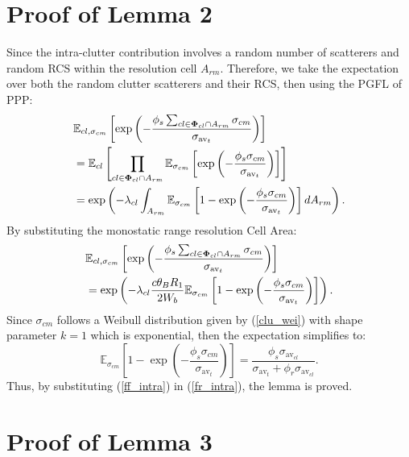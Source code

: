 \documentclass[journal]{IEEEtran}
\begin{document}
\section{Proof of Lemma 2}
Since the intra-clutter contribution involves a random number of scatterers and random  RCS within the resolution cell \( A_{rm} \). Therefore, we take the expectation over both the random clutter scatterers and their RCS, then
using the PGFL of PPP:
\begin{equation}
\begin{aligned}
&\mathbb{E}_{cl, \sigma_{cm}} \left[ \exp\left( - \frac{\phi_s \sum_{cl \in \bold\Phi_{cl} \cap A_{rm}} \sigma_{cm}}{\sigma_{\text{av}_t}} \right) \right]\\
&=\mathbb{E}_{cl}\left[ \prod_{cl \in \bold\Phi_{cl} \cap A_{rm}} \mathbb{E}_{\sigma_{cm}}\left[ \exp\left( - \frac{\phi_s  \sigma_{cm}}{\sigma_{\text{av}_t}} \right)\right] \right]\\
&= \exp\left( - \lambda_{cl} \int_{A_{rm}} \mathbb{E}_{\sigma_{cm}}\left[ 1 - \exp\left( - \frac{\phi_s  \sigma_{cm}}{\sigma_{\text{av}_t}} \right) \right] dA_{rm} \right).
\end{aligned}
\end{equation}
By substituting the monostatic range resolution Cell Area:
\begin{equation}\label{fr_intra}
\begin{aligned}
&\mathbb{E}_{cl, \sigma_{cm}} \left[ \exp\left( - \frac{\phi_s \sum_{cl \in \bold\Phi_{cl} \cap A_{rm}} \sigma_{cm}}{\sigma_{\text{av}_t}} \right) \right] \\
&= \exp \left( - \lambda_{cl} \frac{c \theta_B R_1}{2 W_b} \mathbb{E}_{\sigma_{cm}} \left[ 1 - \exp\left( - \frac{\phi_s  \sigma_{cm}}{\sigma_{\text{av}_t}} \right) \right] \right).
\end{aligned}
\end{equation}
Since \( \sigma_{cm} \) follows a Weibull distribution given by (\ref{clu_wei}) with shape parameter \( k= 1 \) which is exponential, then the expectation simplifies to:
\begin{equation}\label{ff_intra}
\mathbb{E}_{\sigma_{cm}} \left[ 1 - \exp\left( - \frac{\phi_s  \sigma_{cm}}{\sigma_{\text{av}_t}} \right) \right] = \frac{\phi_s  \sigma_{\text{av}_{cl}}}{\sigma_{\text{av}_t} + \phi_r  \sigma_{\text{av}_{cl}}}.
\end{equation}
Thus, by substituting (\ref{ff_intra}) in (\ref{fr_intra}), the lemma is proved.


\section{Proof of Lemma 3}
\end{document}
